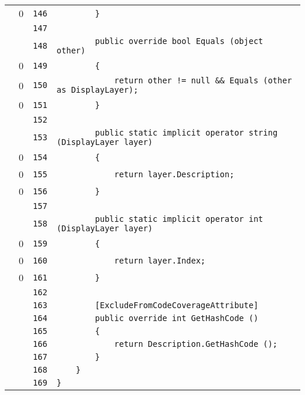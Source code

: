 \documentclass[a4paper,10pt]{article}
\begin{document}
\begin{longtable}[l]{lrrl}
\cellcolor{red} & 0 & \verb~146~ & \verb~        }~\\
\cellcolor{gray} &  & \verb~147~ & \verb~~\\
\cellcolor{gray} &  & \verb~148~ & \verb~        public override bool Equals (object other)~\\
\cellcolor{red} & 0 & \verb~149~ & \verb~        {~\\
\cellcolor{red} & 0 & \verb~150~ & \verb~            return other != null && Equals (other as DisplayLayer);~\\
\cellcolor{red} & 0 & \verb~151~ & \verb~        }~\\
\cellcolor{gray} &  & \verb~152~ & \verb~~\\
\cellcolor{gray} &  & \verb~153~ & \verb~        public static implicit operator string (DisplayLayer layer)~\\
\cellcolor{red} & 0 & \verb~154~ & \verb~        {~\\
\cellcolor{red} & 0 & \verb~155~ & \verb~            return layer.Description;~\\
\cellcolor{red} & 0 & \verb~156~ & \verb~        }~\\
\cellcolor{gray} &  & \verb~157~ & \verb~~\\
\cellcolor{gray} &  & \verb~158~ & \verb~        public static implicit operator int (DisplayLayer layer)~\\
\cellcolor{red} & 0 & \verb~159~ & \verb~        {~\\
\cellcolor{red} & 0 & \verb~160~ & \verb~            return layer.Index;~\\
\cellcolor{red} & 0 & \verb~161~ & \verb~        }~\\
\cellcolor{gray} &  & \verb~162~ & \verb~~\\
\cellcolor{gray} &  & \verb~163~ & \verb~        [ExcludeFromCodeCoverageAttribute]~\\
\cellcolor{gray} &  & \verb~164~ & \verb~        public override int GetHashCode ()~\\
\cellcolor{gray} &  & \verb~165~ & \verb~        {~\\
\cellcolor{gray} &  & \verb~166~ & \verb~            return Description.GetHashCode ();~\\
\cellcolor{gray} &  & \verb~167~ & \verb~        }~\\
\cellcolor{gray} &  & \verb~168~ & \verb~    }~\\
\cellcolor{gray} &  & \verb~169~ & \verb~}~\\
\end{longtable}
\newpage
\end{document}
